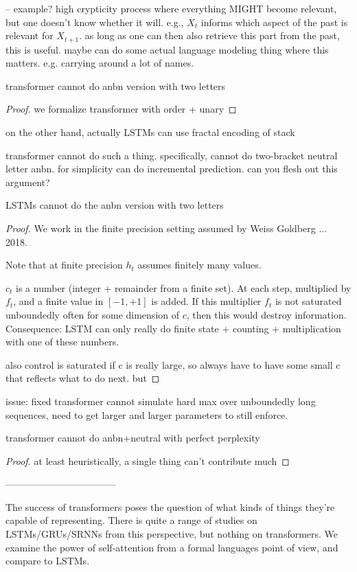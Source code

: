 \documentclass[11pt,a4paper]{article}
\begin{document}
-- example? high crypticity process where everything MIGHT become relevant, but one doesn't know whether it will. e.g., $X_t$ informs which aspect of the past is relevant for $X_{t+1}$. as long as one can then also retrieve this part from the past, this is useful. maybe can do some actual language modeling thing where this matters. e.g. carrying around a lot of names.



transformer cannot do anbn version with two letters
\begin{proof}
we formalize transformer with order + unary
\end{proof}


on the other hand, actually LSTMs can use fractal encoding of stack

transformer cannot do such a thing. specifically, cannot do two-bracket neutral letter anbn. for simplicity can do incremental prediction. can you flesh out this argument?



LSTMs cannot do the anbn version with two letters
\begin{proof}
We work in the finite precision setting assumed by Weiss Goldberg ... 2018.

Note that at finite precision $h_t$ assumes finitely many values.

$c_t$ is a number (integer + remainder from a finite set). At each step, multiplied by $f_t$, and a finite value in $[-1,+1]$ is added.
If this multiplier $f_t$ is not saturated unboundedly often for some dimension of $c$, then this would destroy information.
Consequence: LSTM can only really do finite state + counting + multiplication with one of these numbers.

also control is saturated if c is really large, so always have to have some small c that reflects what to do next. but 
\end{proof}


issue: fixed transformer cannot simulate hard max over unboundedly long sequences, need to get larger and larger parameters to still enforce.

transformer cannot do anbn+neutral with perfect perplexity
\begin{proof}
at least heuristically, a single thing can't contribute much
\end{proof}



-----------------------------------

The success of transformers poses the question of what kinds of things they're capable of representing.
There is quite a range of studies on LSTMs/GRUs/SRNNs from this perspective, but nothing on transformers.
We examine the power of self-attention from a formal languages point of view, and compare to LSTMs.
\end{document}

